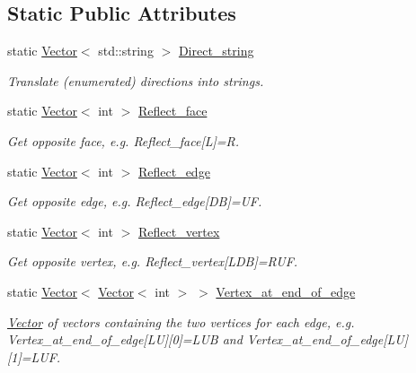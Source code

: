 \subsection*{Static Public Attributes}
\begin{DoxyCompactItemize}
\item 
static \hyperlink{classoomph_1_1Vector}{Vector}$<$ std\+::string $>$ \hyperlink{classoomph_1_1OcTree_a2e9487b716f4d583aada06a850b8eae9}{Direct\+\_\+string}
\begin{DoxyCompactList}\small\item\em Translate (enumerated) directions into strings. \end{DoxyCompactList}\item 
static \hyperlink{classoomph_1_1Vector}{Vector}$<$ int $>$ \hyperlink{classoomph_1_1OcTree_a50b5b6208e34976cb3fd50e84b5c2d05}{Reflect\+\_\+face}
\begin{DoxyCompactList}\small\item\em Get opposite face, e.\+g. Reflect\+\_\+face\mbox{[}L\mbox{]}=R. \end{DoxyCompactList}\item 
static \hyperlink{classoomph_1_1Vector}{Vector}$<$ int $>$ \hyperlink{classoomph_1_1OcTree_aeb757b41fc1c4b7ea697de40c19b6c36}{Reflect\+\_\+edge}
\begin{DoxyCompactList}\small\item\em Get opposite edge, e.\+g. Reflect\+\_\+edge\mbox{[}DB\mbox{]}=UF. \end{DoxyCompactList}\item 
static \hyperlink{classoomph_1_1Vector}{Vector}$<$ int $>$ \hyperlink{classoomph_1_1OcTree_acee0e40be5a1aa25e7356e23ec327636}{Reflect\+\_\+vertex}
\begin{DoxyCompactList}\small\item\em Get opposite vertex, e.\+g. Reflect\+\_\+vertex\mbox{[}L\+DB\mbox{]}=R\+UF. \end{DoxyCompactList}\item 
static \hyperlink{classoomph_1_1Vector}{Vector}$<$ \hyperlink{classoomph_1_1Vector}{Vector}$<$ int $>$ $>$ \hyperlink{classoomph_1_1OcTree_acf182a71db90c350c3f1d334d73d103f}{Vertex\+\_\+at\+\_\+end\+\_\+of\+\_\+edge}
\begin{DoxyCompactList}\small\item\em {\ttfamily \hyperlink{classoomph_1_1Vector}{Vector}} of vectors containing the two vertices for each edge, e.\+g. {\ttfamily Vertex\+\_\+at\+\_\+end\+\_\+of\+\_\+edge}\mbox{[}LU\mbox{]}\mbox{[}0\mbox{]}=L\+UB and {\ttfamily Vertex\+\_\+at\+\_\+end\+\_\+of\+\_\+edge}\mbox{[}LU\mbox{]}\mbox{[}1\mbox{]}=L\+UF. \end{DoxyCompactList}\item 

\end{DoxyCompactItemize}
